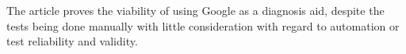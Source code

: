 \documentclass[10pt,letterpaper,final]{article}
\begin{document}
The article \cite{googlingdiagnosis} proves the viability of using
Google as a diagnosis aid, despite the tests being done manually with
little consideration with regard to automation or test reliability and
validity.













\end{document}
